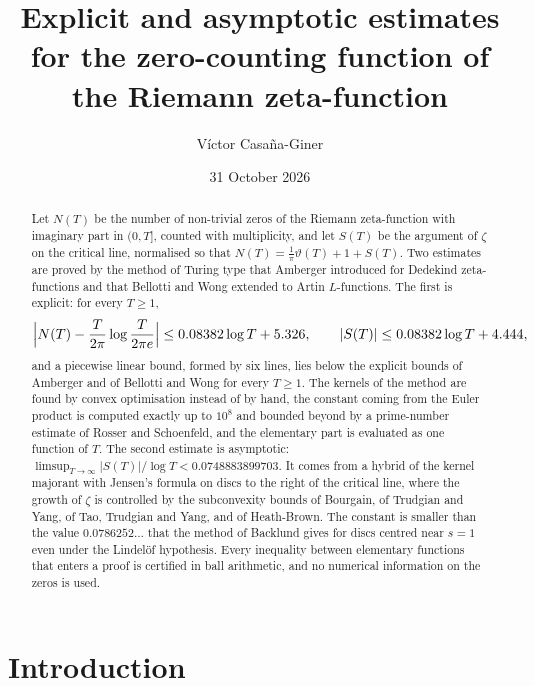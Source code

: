 \documentclass[11pt,reqno]{amsart}
\title[Explicit and asymptotic estimates for $N(T)$]{Explicit and asymptotic estimates for the zero-counting function of the Riemann zeta-function}
\author{V\'ictor Casa\~na-Giner}
\date{31 October 2026}
\numberwithin{equation}{section}
\theoremstyle{definition}
\theoremstyle{remark}
\newcommand{\LineBAone}{0.08382}
\newcommand{\LineBAthreeN}{5.326}
\newcommand{\LineBAthreeS}{4.444}
\newcommand{\CHup}{0.0748883899703}
\begin{document}
\begin{abstract}
Let $N(T)$ be the number of non-trivial zeros of the Riemann zeta-function with imaginary part in $(0,T]$, counted with multiplicity, and let $S(T)$ be the argument of $\zeta$ on the critical line, normalised so that $N(T)=\frac1\pi\vartheta(T)+1+S(T)$. Two estimates are proved by the method of Turing type that Amberger introduced for Dedekind zeta-functions and that Bellotti and Wong extended to Artin $L$-functions. The first is explicit: for every $T\ge1$,
\[
\Bigl|N(T)-\frac T{2\pi}\log\frac T{2\pi e}\Bigr|\le\LineBAone\log T+\LineBAthreeN,\qquad |S(T)|\le\LineBAone\log T+\LineBAthreeS,
\]
and a piecewise linear bound, formed by six lines, lies below the explicit bounds of Amberger and of Bellotti and Wong for every $T\ge1$. The kernels of the method are found by convex optimisation instead of by hand, the constant coming from the Euler product is computed exactly up to $10^8$ and bounded beyond by a prime-number estimate of Rosser and Schoenfeld, and the elementary part is evaluated as one function of $T$. The second estimate is asymptotic: $\limsup_{T\to\infty}|S(T)|/\log T<\CHup$. It comes from a hybrid of the kernel majorant with Jensen's formula on discs to the right of the critical line, where the growth of $\zeta$ is controlled by the subconvexity bounds of Bourgain, of Trudgian and Yang, of Tao, Trudgian and Yang, and of Heath-Brown. The constant is smaller than the value $0.0786252\ldots$ that the method of Backlund gives for discs centred near $s=1$ even under the Lindel\"of hypothesis. Every inequality between elementary functions that enters a proof is certified in ball arithmetic, and no numerical information on the zeros is used.
\end{abstract}

\maketitle
\tableofcontents

\section{Introduction}\label{sec:intro}
\end{document}

